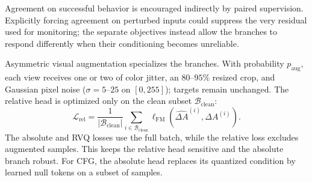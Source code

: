 \documentclass[letterpaper, 10 pt, conference]{ieeeconf}
\begin{document}
Agreement on successful behavior is encouraged indirectly by paired supervision. Explicitly forcing agreement on perturbed inputs could suppress the very residual used for monitoring; the separate objectives instead allow the branches to respond differently when their conditioning becomes unreliable.

Asymmetric visual augmentation specializes the branches. With probability $p_{\mathrm{aug}}$, each view receives one or two of color jitter, an $80$--$95\%$ resized crop, and Gaussian pixel noise ($\sigma{=}5$--$25$ on $[0,255]$); targets remain unchanged. The relative head is optimized only on the clean subset $\mathcal{B}_{\mathrm{clean}}$:
\begin{equation}
    \mathcal{L}_{\mathrm{rel}} =
    \frac{1}{|\mathcal{B}_{\mathrm{clean}}|}
    \sum_{i \in \mathcal{B}_{\mathrm{clean}}}
    \ell_{\mathrm{FM}}(\hat{\Delta A}^{(i)}, \Delta A^{(i)}).
\end{equation}
The absolute and RVQ losses use the full batch, while the relative loss excludes augmented samples. This keeps the relative head sensitive and the absolute branch robust. For CFG, the absolute head replaces its quantized condition by learned null tokens on a subset of samples.
\end{document}
